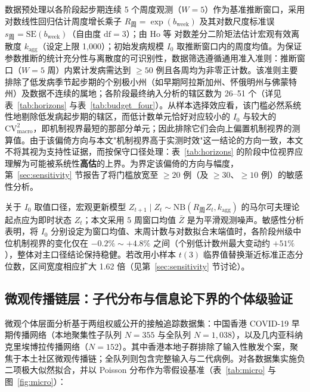 \documentclass[11pt,a4paper]{article}
\theoremstyle{plain}
\theoremstyle{definition}
\begin{document}
数据预处理以各阶段起步期连续 5 个周度观测（$W=5$）作为基准推断窗口，采用对数线性回归估计周度增长乘子 $R_{\text{周}}=\exp(b_{\text{week}})$ 及其对数尺度标准误 $s_{\text{周}}=\text{SE}(b_{\text{week}})$（自由度 $\text{df}=3$）；由 Ho 等\citep{ho2023simultaneous} 对数差分二阶矩法估计宏观有效离散度 $k_{\text{agg}}$（设定上限 1,000）；初始发病规模 $I_0$ 取推断窗口内的周度均值。为保证参数推断的统计充分性与离散度的可识别性，数据筛选遵循通用准入准则：推断窗口（$W=5$ 周）内累计发病需达到 $\ge 50$ 例且各周均为非零正计数。该准则主要排除了低发病季节起步期的个别极小州（如早期阿拉斯加州、怀俄明州与佛蒙特州）及数据不连续的属地；各阶段最终纳入分析的辖区数为 26--51 个（详见表~\ref{tab:horizons} 与表~\ref{tab:budget_four}）。从样本选择效应看，该门槛必然系统性地剔除低发病起步期的辖区，而低计数单元恰好对应较小的 $I_0$ 与较大的 $\text{CV}^2_{\text{macro}}$，即机制视界最短的那部分单元；因此排除它们会向上偏置机制视界的测算值。由于该偏倚方向与本文"机制视界高于实测时效"这一结论的方向一致，本文不将其视为支持性证据，而按保守口径处理：表~\ref{tab:horizons} 的阶段中位视界应理解为可能被系统性\textbf{高估}的上界。为界定该偏倚的方向与幅度，第~\ref{sec:sensitivity} 节报告了将门槛放宽至 $\ge 20$ 例（及 $\ge 30$、$\ge 10$ 例）的敏感性分析。

关于 $I_0$ 取值口径，宏观更新模型 $Z_{t+1}\mid Z_t\sim\text{NB}(R_{\text{周}}Z_t,k_{\text{agg}})$ 的马尔可夫理论起点应为即时状态 $Z_t$；本文采用 5 周窗口均值 $\bar Z$ 是为平滑观测噪声。敏感性分析表明，将 $I_0$ 分别设定为窗口均值、末周计数与对数拟合末端值时，各阶段州级中位机制视界的变化仅在 $-0.2\%\sim +4.8\%$ 之间（个别低计数州最大变动约 $+51\%$），整体对主口径结论保持稳健。若改用小样本 $t(3)$ 临界值替换渐近标准正态分位数，区间宽度相应扩大 1.62 倍（见第~\ref{sec:sensitivity} 节讨论）。

\subsection{微观传播链层：子代分布与信息论下界的个体级验证}\label{sec:micro}

微观个体层面分析基于两组权威公开的接触追踪数据集：中国香港 COVID-19 早期传播网络（本地聚集性子队列 $N=355$ 与全队列 $N=1,038$）\citep{adam2020clustering}，以及几内亚科纳克里埃博拉传播网络（$N=152$）\citep{faye2015chains,althaus2015ebola}。其中香港本地子群排除了输入性散发个案，聚焦于本土社区微观传播链；全队列则包含完整输入与二代病例。对各数据集实施负二项极大似然拟合，并以 Poisson 分布作为零假设基准（表~\ref{tab:micro} 与图~\ref{fig:micro}）：

\begin{table}[htbp]
\centering
\footnotesize
\caption{微观传播链层的子代分布极大似然拟合与信息论下界检验}\label{tab:micro}
\setlength{\tabcolsep}{3pt}%

\end{table}
\end{document}
